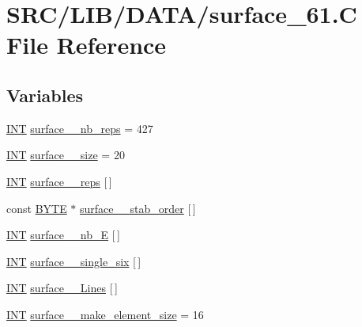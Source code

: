 \hypertarget{surface__61_8_c}{}\section{S\+R\+C/\+L\+I\+B/\+D\+A\+T\+A/surface\+\_\+61.C File Reference}
\label{surface__61_8_c}
\subsection*{Variables}
\begin{DoxyCompactItemize}
\item 
\mbox{\hyperlink{galois_8h_a09fddde158a3a20bd2dcadb609de11dc}{I\+NT}} \mbox{\hyperlink{surface__61_8_c_a3b6becd6ff1de43fd798de7901ac1a31}{surface\+\_\+\_\+nb\+\_\+reps}} = 427
\item 
\mbox{\hyperlink{galois_8h_a09fddde158a3a20bd2dcadb609de11dc}{I\+NT}} \mbox{\hyperlink{surface__61_8_c_a83b1e57a14425e2d01cbbed207ec7ac6}{surface\+\_\+\_\+size}} = 20
\item 
\mbox{\hyperlink{galois_8h_a09fddde158a3a20bd2dcadb609de11dc}{I\+NT}} \mbox{\hyperlink{surface__61_8_c_a19250ab95de31383ce11f890af0ad61c}{surface\+\_\+\_\+reps}} \mbox{[}$\,$\mbox{]}
\item 
const \mbox{\hyperlink{galois_8h_ab6cc7b4aeb6ea31aba2b3fbfc83ff5e6}{B\+Y\+TE}} $\ast$ \mbox{\hyperlink{surface__61_8_c_a559386804685d62ff9c963a4e07af669}{surface\+\_\+\_\+stab\+\_\+order}} \mbox{[}$\,$\mbox{]}
\item 
\mbox{\hyperlink{galois_8h_a09fddde158a3a20bd2dcadb609de11dc}{I\+NT}} \mbox{\hyperlink{surface__61_8_c_a03d047e8149e6652b9d6530feaf4d9bf}{surface\+\_\+\_\+nb\+\_\+E}} \mbox{[}$\,$\mbox{]}
\item 
\mbox{\hyperlink{galois_8h_a09fddde158a3a20bd2dcadb609de11dc}{I\+NT}} \mbox{\hyperlink{surface__61_8_c_a84f7e2502c09fecb069d9d9a3c8d635c}{surface\+\_\+\_\+single\+\_\+six}} \mbox{[}$\,$\mbox{]}
\item 
\mbox{\hyperlink{galois_8h_a09fddde158a3a20bd2dcadb609de11dc}{I\+NT}} \mbox{\hyperlink{surface__61_8_c_aa3458644f31c44bf1ae86a749d4803ce}{surface\+\_\+\_\+\+Lines}} \mbox{[}$\,$\mbox{]}
\item 
\mbox{\hyperlink{galois_8h_a09fddde158a3a20bd2dcadb609de11dc}{I\+NT}} \mbox{\hyperlink{surface__61_8_c_ae6b3d2807850efe3ba4f5dcbd940e509}{surface\+\_\+\_\+make\+\_\+element\+\_\+size}} = 16
\item 

\end{DoxyCompactItemize}
